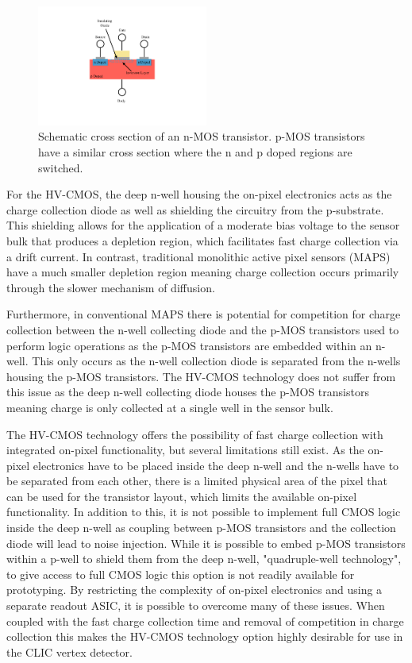 \begin{figure}[h!]
\centering
\includegraphics[width=0.5\textwidth]{CLICdpVertex/Plots/FETDiagram.pdf}
\caption[Schematic cross section of an n-MOS transistor.  p-MOS transistors have a similar cross section where the n and p doped regions are switched.]{Schematic cross section of an n-MOS transistor.  p-MOS transistors have a similar cross section where the n and p doped regions are switched.}
\label{fig:nmos}
\end{figure}

For the HV-CMOS, the deep n-well housing the on-pixel electronics acts as the charge collection diode as well as shielding the circuitry from the p-substrate.  This shielding allows for the application of a moderate bias voltage to the sensor bulk that produces a depletion region, which facilitates fast charge collection via a drift current.  In contrast, traditional monolithic active pixel sensors (MAPS) have a much smaller depletion region meaning charge collection occurs primarily through the slower mechanism of diffusion.  

Furthermore, in conventional MAPS there is potential for competition for charge collection between the n-well collecting diode and the p-MOS transistors used to perform logic operations as the p-MOS transistors are embedded within an n-well.  This only occurs as the n-well collection diode is separated from the n-wells housing the p-MOS transistors.  The HV-CMOS technology does not suffer from this issue as the deep n-well collecting diode houses the p-MOS transistors meaning charge is only collected at a single well in the sensor bulk.  

The HV-CMOS technology offers the possibility of fast charge collection with integrated on-pixel functionality, but several limitations still exist.  As the on-pixel electronics have to be placed inside the deep n-well and the n-wells have to be separated from each other, there is a limited physical area of the pixel that can be used for the transistor layout, which limits the available on-pixel functionality.  In addition to this, it is not possible to implement full CMOS logic inside the deep n-well as coupling between p-MOS transistors and the collection diode will lead to noise injection.  While it is possible to embed p-MOS transistors within a p-well to shield them from the deep n-well, "quadruple-well technology", to give access to full CMOS logic this option is not readily available for prototyping.  By restricting the complexity of on-pixel electronics and using a separate readout ASIC, it is possible to overcome many of these issues.  When coupled with the fast charge collection time and removal of competition in charge collection this makes the HV-CMOS technology option highly desirable for use in the CLIC vertex detector.

